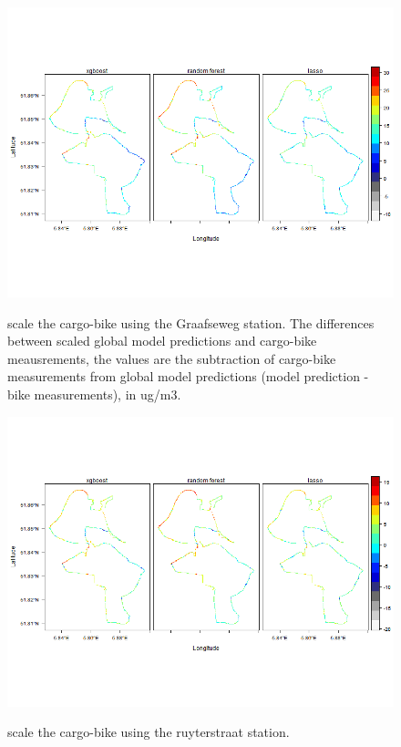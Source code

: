 \documentclass{article}
\begin{document}
\begin{figure}[H]
    \includegraphics[width=\linewidth]{f4a.png}
    \label{Graafseweg}
    \caption {scale the cargo-bike using the Graafseweg station. The differences between scaled global model predictions and cargo-bike meausrements, the values are the subtraction of cargo-bike measurements from global model predictions (model prediction - bike measurements), in ug/m3.}
\end{figure}
\begin{figure}[H]
    \includegraphics[width=\linewidth]{f4b.png}
    \label{ruyterstraat}
    \caption {scale the cargo-bike using the ruyterstraat station.}
\end{figure}
\end{document}
